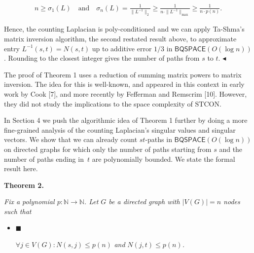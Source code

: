 \[\begin{gathered}
\displaystyle n\geq\sigma_{1}(L)\quad\text{and}\quad\sigma_{n}(L)=\frac{1}{\|L^{-1}\|_{2}}\geq\frac{1}{n\cdot\|L^{-1}\|_{\max}}\geq\frac{1}{n\cdot p(n)}.
\end{gathered}\]


Hence, the counting Laplacian is poly-conditioned and we can apply Ta-Shma’s matrix inversion algorithm, the second restated result above, to approximate entry $L^{-1}(s,t)=N(s,t)$ up to additive error $1/3$ in $\mathsf{BQSPACE}(O(\log n))$. Rounding to the closest integer gives the number of paths from $s$ to $t$.
$\blacktriangleleft$\par




The proof of Theorem 1 uses a reduction of summing matrix powers to matrix inversion.
The idea for this is well-known, and appeared in this context in early work by Cook [7], and more recently by Fefferman and Remscrim [10]. However, they did not study the implications to the space complexity of $\mathrm{STCON}$.\par




In Section 4 we push the algorithmic idea of Theorem 1 further by doing a more fine-grained analysis of the counting Laplacian’s singular values and singular vectors.
We show that we can already count $st$-paths in $\mathsf{BQSPACE}(O(\log n))$ on directed graphs for which only the number of paths starting from $s$ and the number of paths ending in $t$ are polynomially bounded.
We state the formal result here.\par





\par\medskip\noindent\textbf{
\textbf{Theorem 2}\textbf{.}
}\par



\emph{Fix a polynomial $p:\mathbb{N}\rightarrow\mathbb{N}$. Let $G$ be a directed graph with $|V(G)|=n$ nodes such that}\par


\begin{itemize}


\item[] 
$\blacksquare$ 


$\forall j\in V(G):N(s,j)\leq p(n)$\emph{ and }$N(j,t)\leq p(n)$\emph{.}\par





\end{itemize}


